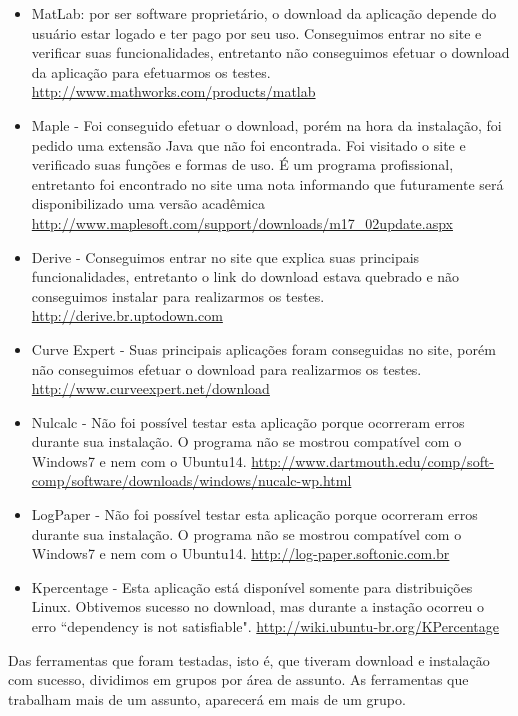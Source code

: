 \documentclass[12pt,a4paper]{article}
\begin{document}
\begin{itemize}
	\item MatLab: por ser software proprietário, o download da aplicação depende do usuário estar logado e ter pago por seu uso.  Conseguimos entrar no site e verificar suas funcionalidades, entretanto não conseguimos efetuar o download da aplicação para efetuarmos os testes. \url{http://www.mathworks.com/products/matlab}
	\item Maple - Foi conseguido efetuar o download, porém na hora da instalação, foi pedido uma extensão Java que não foi encontrada. Foi visitado o site e verificado suas funções e formas de uso. É um programa profissional, entretanto foi encontrado no site uma nota informando que futuramente será disponibilizado uma versão acadêmica \url{http://www.maplesoft.com/support/downloads/m17_02update.aspx}
	\item Derive - Conseguimos entrar no site que explica suas principais funcionalidades, entretanto o link do download estava quebrado e não conseguimos instalar para realizarmos os testes. \url{http://derive.br.uptodown.com}
    \item Curve Expert - Suas principais aplicações foram conseguidas no site, porém não conseguimos efetuar o download para realizarmos os testes. \url{http://www.curveexpert.net/download}
	\item Nulcalc - Não foi possível testar esta aplicação porque ocorreram erros durante sua instalação. O programa não se mostrou compatível com o Windows7 e nem com o Ubuntu14. \url{http://www.dartmouth.edu/comp/soft-comp/software/downloads/windows/nucalc-wp.html}
	\item LogPaper - Não foi possível testar esta aplicação porque ocorreram erros durante sua instalação. O programa não se mostrou compatível com o Windows7 e nem com o Ubuntu14. \url{http://log-paper.softonic.com.br}
	 \item Kpercentage - Esta aplicação está disponível somente para distribuições Linux. Obtivemos sucesso no download, mas durante a instação ocorreu o erro ``dependency is not satisfiable". \url{http://wiki.ubuntu-br.org/KPercentage}
\end{itemize}
        
Das ferramentas que foram testadas, isto é, que tiveram download e instalação com sucesso, dividimos em grupos por área de assunto. As ferramentas que trabalham mais de um assunto, aparecerá em mais de um grupo.
\end{document}
